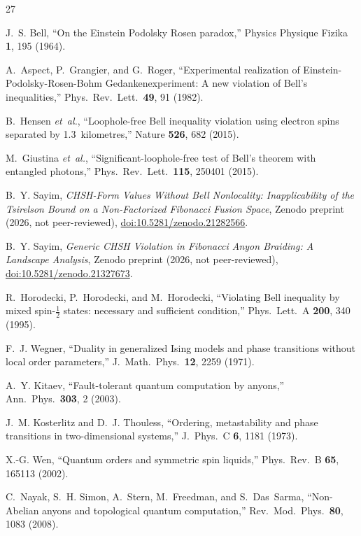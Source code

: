 \documentclass[aps,pra,twocolumn,superscriptaddress,showpacs,floatfix]{revtex4-2}
\begin{document}
\begin{thebibliography}{27}

J.~S. Bell,
``On the Einstein Podolsky Rosen paradox,''
Physics Physique Fizika \textbf{1}, 195 (1964).

A.~Aspect, P.~Grangier, and G.~Roger,
``Experimental realization of Einstein-Podolsky-Rosen-Bohm Gedankenexperiment:
A new violation of Bell's inequalities,''
Phys.\ Rev.\ Lett.\ \textbf{49}, 91 (1982).

B.~Hensen \emph{et~al.},
``Loophole-free Bell inequality violation using electron spins separated by
1.3~kilometres,''
Nature \textbf{526}, 682 (2015).

M.~Giustina \emph{et~al.},
``Significant-loophole-free test of Bell's theorem with entangled photons,''
Phys.\ Rev.\ Lett.\ \textbf{115}, 250401 (2015).

B.~Y. Sayim,
\emph{CHSH-Form Values Without Bell Nonlocality: Inapplicability of the
Tsirelson Bound on a Non-Factorized Fibonacci Fusion Space},
Zenodo preprint (2026, not peer-reviewed),
\href{https://doi.org/10.5281/zenodo.21282566}{doi:10.5281/zenodo.21282566}.

B.~Y. Sayim,
\emph{Generic CHSH Violation in Fibonacci Anyon Braiding: A Landscape Analysis},
Zenodo preprint (2026, not peer-reviewed),
\href{https://doi.org/10.5281/zenodo.21327673}{doi:10.5281/zenodo.21327673}.

R.~Horodecki, P.~Horodecki, and M.~Horodecki,
``Violating Bell inequality by mixed spin-$\tfrac{1}{2}$ states: necessary and
sufficient condition,''
Phys.\ Lett.\ A \textbf{200}, 340 (1995).

F.~J. Wegner,
``Duality in generalized Ising models and phase transitions without local order
parameters,''
J.\ Math.\ Phys.\ \textbf{12}, 2259 (1971).

A.~Y. Kitaev,
``Fault-tolerant quantum computation by anyons,''
Ann.\ Phys.\ \textbf{303}, 2 (2003).

J.~M. Kosterlitz and D.~J. Thouless,
``Ordering, metastability and phase transitions in two-dimensional systems,''
J.\ Phys.\ C \textbf{6}, 1181 (1973).

X.-G. Wen,
``Quantum orders and symmetric spin liquids,''
Phys.\ Rev.\ B \textbf{65}, 165113 (2002).

C.~Nayak, S.~H. Simon, A.~Stern, M.~Freedman, and S.~Das~Sarma,
``Non-Abelian anyons and topological quantum computation,''
Rev.\ Mod.\ Phys.\ \textbf{80}, 1083 (2008).


\end{thebibliography}
\end{document}
